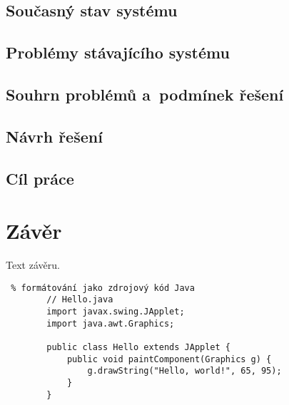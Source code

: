 \documentclass[12pt, a4paper]{report}
\begin{document}
		\section{Současný stav systému}
		
		\section{Problémy stávajícího systému}
		\section{Souhrn problémů a~podmínek řešení}
		\section{Návrh řešení}
		\section{Cíl práce}
	
	\chapter*{Závěr}
	Text závěru.
	
	

	\newpage

	\begin{lstlisting} % formátování jako zdrojový kód Java
		// Hello.java
		import javax.swing.JApplet;
		import java.awt.Graphics;

		public class Hello extends JApplet {
			public void paintComponent(Graphics g) {
				g.drawString("Hello, world!", 65, 95);
			}    
		}
	\end{lstlisting}
	
\end{document}
